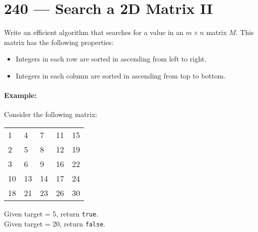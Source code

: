 \section{240 --- Search a 2D Matrix II}
Write an efficient algorithm that searches for a value in an $m \times n$ matrix $M$. This matrix has the following properties:
\begin{itemize}
\item Integers in each row are sorted in ascending from left to right.
\item Integers in each column are sorted in ascending from top to bottom.
\end{itemize}

\paragraph{Example:}
\begin{flushleft}
Consider the following matrix:
\begin{table}[H]
\begin{tabular}{lllll}
1  & 4  & 7  & 11 & 15 \\
2  & 5  & 8  & 12 & 19 \\
3  & 6  & 9  & 16 & 22 \\
10 & 13 & 14 & 17 & 24 \\
18 & 21 & 23 & 26 & 30
\end{tabular}
\end{table}
Given target = 5, return \texttt{true}.
\\
Given target = 20, return \texttt{false}.
\end{flushleft}
